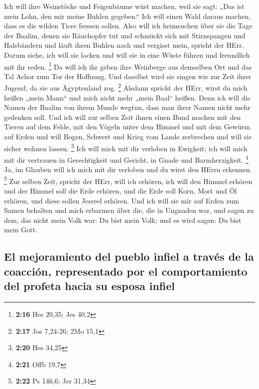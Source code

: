  Ich will ihre Weinstöcke und Feigenbäume wüst machen,
weil sie sagt: „Das ist mein Lohn, den mir meine Buhlen gegeben.`` Ich
will einen Wald daraus machen, dass es die wilden Tiere fressen sollen.
 Also will ich heimsuchen über sie die Tage der Baalim,
denen sie Räuchopfer tut und schmückt sich mit Stirnspangen und
Halsbändern und läuft ihren Buhlen nach und vergisst mein, spricht der
HErr.  Darum siehe, ich will sie locken und will sie in
eine Wüste führen und freundlich mit ihr reden. \footnote{\textbf{2:16}
  Hes 20,35; Jes 40,2}  Da will ich ihr geben ihre
Weinberge aus demselben Ort und das Tal Achor zum Tor der Hoffnung. Und
daselbst wird sie singen wie zur Zeit ihrer Jugend, da sie aus
Ägyptenland zog. \footnote{\textbf{2:17} Jos 7,24-26; 2Mo 15,1}
 Alsdann spricht der HErr, wirst du mich heißen „mein
Mann`` und mich nicht mehr „mein Baal`` heißen.  Denn ich
will die Namen der Baalim von ihrem Munde wegtun, dass man ihrer Namen
nicht mehr gedenken soll.  Und ich will zur selben Zeit
ihnen einen Bund machen mit den Tieren auf dem Felde, mit den Vögeln
unter dem Himmel und mit dem Gewürm auf Erden und will Bogen, Schwert
und Krieg vom Lande zerbrechen und will sie sicher wohnen lassen.
\footnote{\textbf{2:20} Hes 34,25}  Ich will mich mit dir
verloben in Ewigkeit; ich will mich mit dir vertrauen in Gerechtigkeit
und Gericht, in Gnade und Barmherzigkeit. \footnote{\textbf{2:21} Offb
  19,7}  Ja, im Glauben will ich mich mit dir verloben
und du wirst den HErrn erkennen. \footnote{\textbf{2:22} Ps 146,6; Jer
  31,34}  Zur selben Zeit, spricht der HErr, will ich
erhören, ich will den Himmel erhören und der Himmel soll die Erde
erhören,  und die Erde soll Korn, Most und Öl erhören,
und diese sollen Jesreel erhören.  Und ich will sie mir
auf Erden zum Samen behalten und mich erbarmen über die, die in Ungnaden
war, und sagen zu dem, das nicht mein Volk war: Du bist mein Volk; und
es wird sagen: Du bist mein Gott.

\hypertarget{el-mejoramiento-del-pueblo-infiel-a-travuxe9s-de-la-coacciuxf3n-representado-por-el-comportamiento-del-profeta-hacia-su-esposa-infiel}{%
\subsection{El mejoramiento del pueblo infiel a través de la coacción,
representado por el comportamiento del profeta hacia su esposa
infiel}\label{el-mejoramiento-del-pueblo-infiel-a-travuxe9s-de-la-coacciuxf3n-representado-por-el-comportamiento-del-profeta-hacia-su-esposa-infiel}}


